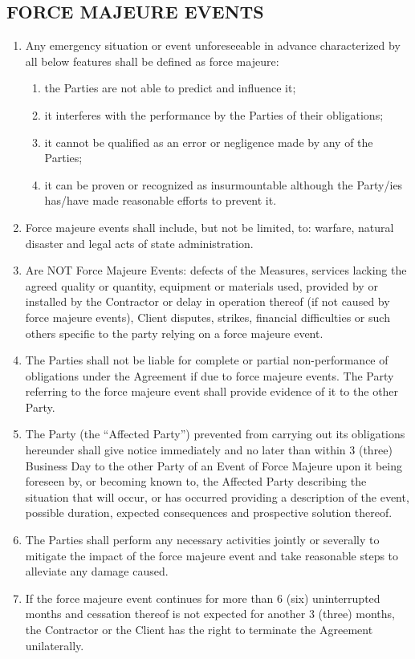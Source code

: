 \begin{multicols}{2}
\subsection{FORCE MAJEURE EVENTS}
\begin{enumerate}
	\item	Any emergency situation or event unforeseeable in advance characterized by all below features shall be defined as force majeure:
	\begin{enumerate}
		\item	the Parties are not able to predict and influence it;
		\item	it interferes with the performance by the Parties of their obligations;
		\item	it cannot be qualified as an error or negligence made by any of the Parties;
		\item	it can be proven or recognized as insurmountable although the Party/ies has/have made reasonable efforts to prevent it.
	\end{enumerate}
	\item	Force majeure events shall include, but not be limited, to: warfare, natural disaster and legal acts of state administration.
	\item	Are NOT Force Majeure Events: defects of the Measures, services lacking the agreed quality or quantity, equipment or materials used, provided by or installed by the Contractor or delay in operation thereof (if not caused by force majeure events), Client disputes, strikes, financial difficulties or such others specific to the party relying on a force majeure event.
	\item	The Parties shall not be liable for complete or partial non-performance of obligations under the Agreement if due to force majeure events. The Party referring to the force majeure event shall provide evidence of it to the other Party.
	\item	The Party (the “Affected Party”) prevented from carrying out its obligations hereunder shall give notice immediately and no later than within 3 (three) Business Day to the other Party of an Event of Force Majeure upon it being foreseen by, or becoming known to, the Affected Party describing the situation that will occur, or has occurred providing a description of the event, possible duration, expected consequences and prospective solution thereof.
	\item	The Parties shall perform any necessary activities jointly or severally to mitigate the impact of the force majeure event and take reasonable steps to alleviate any damage caused.
	\item	If the force majeure event continues for more than 6 (six) uninterrupted months and cessation thereof is not expected for another 3 (three) months, the Contractor or the Client has the right to terminate the Agreement unilaterally.
\end{enumerate}


\end{multicols}
